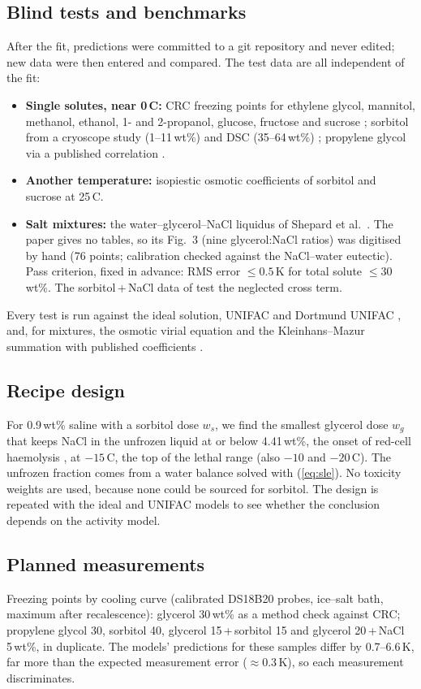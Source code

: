 \documentclass[10pt,a4paper]{article}
\begin{document}
\subsection{Blind tests and benchmarks}
After the fit, predictions were committed to a git repository and never edited; new data were then entered
and compared. The test data are all independent of the fit:
\begin{itemize}
\item \textbf{Single solutes, near 0\,\textdegree C:} CRC freezing points for ethylene glycol, mannitol,
methanol, ethanol, 1- and 2-propanol, glucose, fructose and sucrose \cite{crc}; sorbitol from a cryoscope study
(1--11\,wt\%) \cite{baer} and DSC (35--64\,wt\%) \cite{siniti}; propylene glycol via a published correlation \cite{zielinski}.
\item \textbf{Another temperature:} isopiestic osmotic coefficients of sorbitol \cite{bower} and sucrose
\cite{robinson} at 25\,\textdegree C.
\item \textbf{Salt mixtures:} the water--glycerol--NaCl liquidus of Shepard et al.\ \cite{shepard}. The paper
gives no tables, so its Fig.~3 (nine glycerol:NaCl ratios) was digitised by hand (76 points; calibration
checked against the NaCl--water eutectic). Pass criterion, fixed in advance: RMS error $\le 0.5$\,K for total
solute $\le 30$\,wt\%. The sorbitol\,+\,NaCl data of \cite{bower} test the neglected cross term.
\end{itemize}
Every test is run against the ideal solution, UNIFAC and Dortmund UNIFAC \cite{unifac,dortmund,thermo}, and, for
mixtures, the osmotic virial equation and the Kleinhans--Mazur summation with published coefficients
\cite{zielinski,km}.

\subsection{Recipe design}
For 0.9\,wt\% saline with a sorbitol dose $w_s$, we find the smallest glycerol dose $w_g$ that keeps NaCl in
the unfrozen liquid at or below 4.41\,wt\%, the onset of red-cell haemolysis \cite{lovelock11,shepard}, at
$-15$\,\textdegree C, the top of the lethal range \cite{gao} (also $-10$ and $-20$\,\textdegree C). The unfrozen
fraction comes from a water balance solved with (\ref{eq:sle}). No toxicity weights are used, because none could
be sourced for sorbitol. The design is repeated with the ideal and UNIFAC models to see whether the
conclusion depends on the activity model.

\subsection{Planned measurements}
Freezing points by cooling curve (calibrated DS18B20 probes, ice--salt bath, maximum after recalescence):
glycerol 30\,wt\% as a method check against CRC; propylene glycol 30, sorbitol 40, glycerol 15\,+\,sorbitol 15 and
glycerol 20\,+\,NaCl 5\,wt\%, in duplicate. The models' predictions for these samples differ by 0.7--6.6\,K,
far more than the expected measurement error ($\approx$0.3\,K), so each measurement discriminates.
\end{document}
